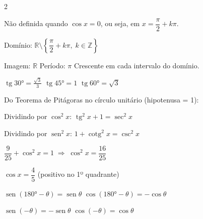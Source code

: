 \documentclass[12pt]{article}
\begin{document}
\begin{multicols}{2}

Não definida quando $\cos x = 0$, ou seja, em $x = \dfrac{\pi}{2} + k\pi$.

Domínio: $\mathbb{R} \setminus \!\left\{\dfrac{\pi}{2} + k\pi,\; k \in \mathbb{Z}\right\}$

Imagem: $\mathbb{R}$ \quad Período: $\pi$ \quad Crescente em cada intervalo do domínio.

$\operatorname{tg} 30° = \tfrac{\sqrt{3}}{3}$ \quad $\operatorname{tg} 45° = 1$ \quad $\operatorname{tg} 60° = \sqrt{3}$


Do Teorema de Pitágoras no círculo unitário (hipotenusa = 1):



Dividindo por $\cos^2 x$: \quad $\operatorname{tg}^2 x + 1 = \sec^2 x$

Dividindo por $\operatorname{sen}^2 x$: \quad $1 + \operatorname{cotg}^2 x = \csc^2 x$


$\dfrac{9}{25} + \cos^2 x = 1 \;\Rightarrow\; \cos^2 x = \dfrac{16}{25}$

$\cos x = \dfrac{4}{5}$ \hfill {\small(positivo no 1º quadrante)}


$\operatorname{sen}(180° - \theta) = \operatorname{sen}\theta$ \quad $\cos(180° - \theta) = -\cos\theta$

$\operatorname{sen}(-\theta) = -\operatorname{sen}\theta$ \quad $\cos(-\theta) = \cos\theta$

\end{multicols}


\end{document}

